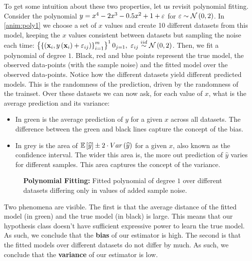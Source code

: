 To get some intuition about these two properties, let us revisit polynomial fitting. Consider the polynomial $y=x^4-2x^3-0.5x^2+1+\varepsilon$ for $\varepsilon\sim\mathcal{N}\left(0,2\right)$. In \autoref{anim:poly1} we choose a set of $x$ values and create 10 different datasets from this model, keeping the $x$ values consistent between datasets but sampling the noise each time: $\left\{\left\{\left(\mathbf{x}_i, y\left(\mathbf{x}_i\right) + \varepsilon_{ij}\right)\right\}^m_{i=1}\right\}^10_{j=1},\,\, \varepsilon_{ij}\overset{iid}{\sim}\mathcal{N}\left(0,2\right)$. Then, we fit a polynomial of degree $1$. Black, red and blue points represent the true model, the observed data-points (with the sample noise) and the fitted model over the observed data-points. Notice how the different datasets yield different predicted models. This is the randomness of the prediction, driven by the randomness of the trainset. Over these datasets we can now ask, for each value of $x$, what is the average prediction and its variance:\\
\begin{itemize}
	\item In green is the average prediction of $y$ for a given $x$ across all datasets. The difference between the green and black lines capture the concept of the bias.
	\item In grey is the area of $\mathbb{E}\left[\widehat{y}\right]\pm 2\cdot Var\left(\widehat{y}\right)$ for a given $x$, also known as the confidence interval. The wider this area is, the more out prediction of $\widehat{y}$ varies for different samples. This area captures the concept of the variance.
\end{itemize}

\begin{figure}[h!]
	\centering
	\caption{\textbf{Polynomial Fitting:} Fitted polynomial of degree $1$ over different datasets differing only in values of added sample noise. \GitChapterTwoExamples}\label{anim:poly1}
\end{figure}

Two phenomena are visible. The first is that the average distance of the fitted model (in green) and the true model (in black) is large. This means that our hypothesis class doesn't have sufficient expressive power to learn the true model. As such, we conclude that the \textbf{bias} of our estimator is high. The second is that the fitted models over different datasets do not differ by much. As such, we conclude that the \textbf{variance} of our estimator is low.\\

